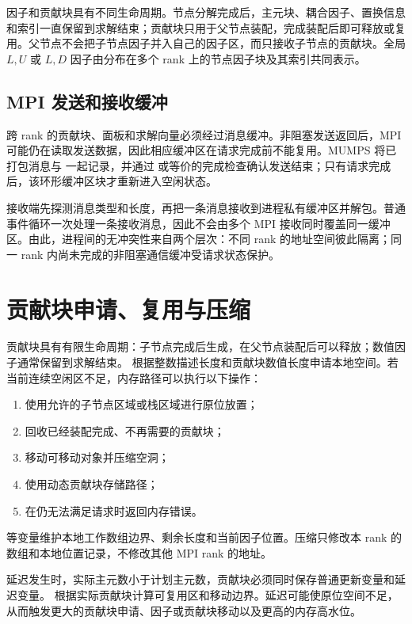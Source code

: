 因子和贡献块具有不同生命周期。节点分解完成后，主元块、耦合因子、置换信息和索引一直保留到求解结束；贡献块只用于父节点装配，完成装配后即可释放或复用。父节点不会把子节点因子并入自己的因子区，而只接收子节点的贡献块。全局 $L,U$ 或 $L,D$ 因子由分布在多个 rank 上的节点因子块及其索引共同表示。

\subsection{MPI 发送和接收缓冲}

跨 rank 的贡献块、面板和求解向量必须经过消息缓冲。非阻塞发送返回后，MPI 可能仍在读取发送数据，因此相应缓冲区在请求完成前不能复用。MUMPS 将已打包消息与  一起记录，并通过  或等价的完成检查确认发送结束；只有请求完成后，该环形缓冲区块才重新进入空闲状态。

接收端先探测消息类型和长度，再把一条消息接收到进程私有缓冲区并解包。普通事件循环一次处理一条接收消息，因此不会由多个 MPI 接收同时覆盖同一缓冲区。由此，进程间的无冲突性来自两个层次：不同 rank 的地址空间彼此隔离；同一 rank 内尚未完成的非阻塞通信缓冲受请求状态保护。

\section{贡献块申请、复用与压缩}

贡献块具有有限生命周期：子节点完成后生成，在父节点装配后可以释放；数值因子通常保留到求解结束。 根据整数描述长度和贡献块数值长度申请本地空间。若当前连续空闲区不足，内存路径可以执行以下操作：

\begin{enumerate}
  \item 使用允许的子节点区域或栈区域进行原位放置；
  \item 回收已经装配完成、不再需要的贡献块；
  \item 移动可移动对象并压缩空洞；
  \item 使用动态贡献块存储路径；
  \item 在仍无法满足请求时返回内存错误。
\end{enumerate}

 等变量维护本地工作数组边界、剩余长度和当前因子位置。压缩只修改本 rank 的数组和本地位置记录，不修改其他 MPI rank 的地址。

延迟发生时，实际主元数小于计划主元数，贡献块必须同时保存普通更新变量和延迟变量。 根据实际贡献块计算可复用区和移动边界。延迟可能使原位空间不足，从而触发更大的贡献块申请、因子或贡献块移动以及更高的内存高水位。

